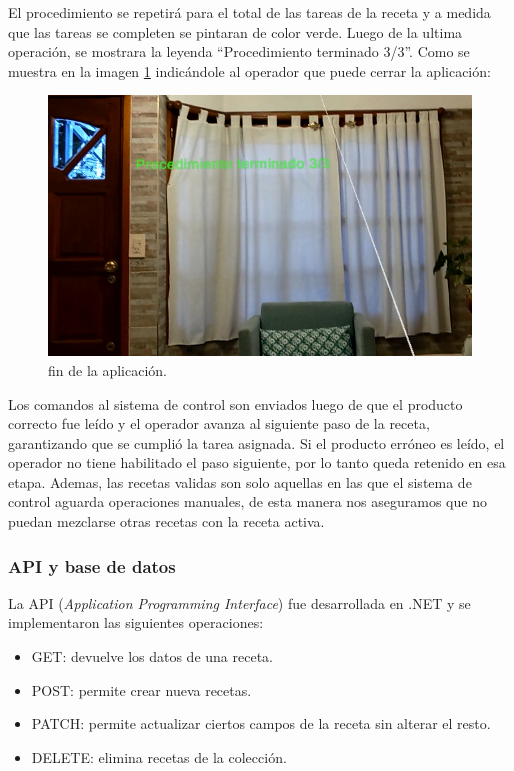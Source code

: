 El procedimiento se repetirá para el total de las tareas de la receta y a medida que las tareas se completen se pintaran de color verde. Luego de la ultima operación, se mostrara la leyenda ``Procedimiento terminado 3/3''. Como se muestra en la imagen \ref{fig:i18} indicándole al operador que puede cerrar la aplicación:

\begin{figure}[htpb]
	\centering
	\includegraphics[scale=.5]{./Figures/i18.PNG}
	\caption{fin de la aplicación\protect\footnotemark.}
	\label{fig:i18}
\end{figure} 

\vspace{60px}
Los comandos al sistema de control son enviados luego de que el producto correcto fue leído y el operador avanza al siguiente paso de la receta, garantizando que se cumplió la tarea asignada. Si el producto erróneo es leído, el operador no tiene habilitado el paso siguiente, por lo tanto queda retenido en esa etapa. Ademas, las recetas validas son solo aquellas en las que el sistema de control aguarda operaciones manuales, de esta manera nos aseguramos que no puedan mezclarse otras recetas con la receta activa.

\subsubsection{API y base de datos}
La API (\textit{Application Programming Interface}) fue desarrollada en .NET y se implementaron las siguientes operaciones:

\begin{itemize}
\item GET: devuelve los datos de una receta.
\item POST: permite crear nueva recetas.
\item PATCH: permite actualizar ciertos campos de la receta sin alterar el resto.
\item DELETE: elimina recetas de la colección.
\end{itemize}

